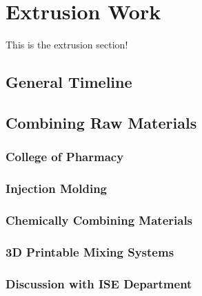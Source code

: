\section{Extrusion Work\label{methedology:extrusion}}
This is the extrusion section!

\subsection{General Timeline\label{sec:methedology:extrusion:timeline}}

\subsection{Combining Raw Materials\label{sec:methedology:extrusion:combiningMaterials}}

\subsubsection{College of Pharmacy\label{sec:methedology:extrusion:combiningMaterials:pharmacy}}

\subsubsection{Injection Molding\label{sec:methedology:extrusion:combiningMaterials:injectionMolding}}

\subsubsection{Chemically Combining Materials\label{sec:methedology:extrusion:combiningMaterials:chemicallyCombining}}

\subsubsection{3D Printable Mixing Systems\label{sec:methedology:extrusion:combiningMaterials:3dPrintedMixers}}

\subsubsection{Discussion with ISE Department\label{sec:methedology:extrusion:combiningMaterials:iseDiscussion}}

